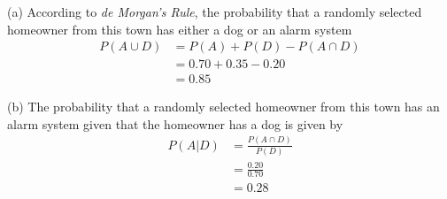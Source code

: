 \documentclass[boxes, qed]{homework}
\begin{document}
\begin{solution}(a) According to \textit{de Morgan's Rule},
  the probability that a randomly selected homeowner 
  from this town has either a dog or an alarm system
  \begin{align*}
    P(A\cup{D})
      &= P(A) + P(D) - P(A\cap{D})\\
      &= 0.70 + 0.35 - 0.20\\
      &= \boxed{0.85}
  \end{align*}

  (b) The probability that a randomly selected homeowner 
  from this town has an alarm system given that the homeowner has a dog
  is given by
  \begin{align*}
    P(A|D) &= \frac{P(A\cap{D})}{P(D)}\\
    &= \frac{0.20}{0.70}\\
    &= 0.28
  \end{align*}
\end{solution}
\end{document}
